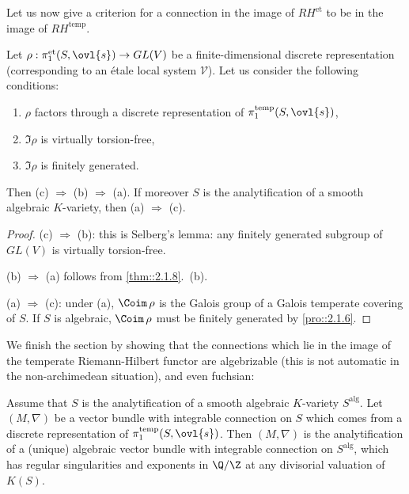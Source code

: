 \begin{para}\label{para::3.5.9} Let us now give a criterion for a connection
 in the image of $RH^{\mathrm{et}}$ to be in the image of $RH^{\mathrm{temp}}$.
\end{para}

\begin{pro}\label{pro::3.5.10} Let $\rho:
\pi_1^{\mathrm{et}}(S,\ovl{s}) \to GL(V)$ be a finite-dimensional
 discrete representation (corresponding to an \'etale local system 
 $\mathcal{V}$). Let us consider the following conditions:
 \begin{enumerate}
  \renewcommand{\theenumi}{\alph{enumi}}
  \item $\rho$ factors through a discrete representation of
	$\pi_1^{\mathrm{temp}}(S,\ovl{s})$,
  \item $\Im \rho$ is virtually torsion-free,
  \item $\Im \rho$ is finitely generated.
 \end{enumerate}
 Then {\rm (c)} $\Rightarrow$ {\rm (b)} $\Rightarrow$ {\rm (a)}. If moreover
 $S$ is the 
 analytification of a smooth algebraic $K$-variety, 
 then {\rm (a)} $\Rightarrow$ {\rm (c)}.
\end{pro}

\begin{proof}
 (c) $\Rightarrow$ (b): this is Selberg's lemma: any finitely
 generated subgroup of $GL(V)$ is virtually torsion-free.

 (b) $\Rightarrow$ (a) follows from \ref{thm::2.1.8}.~(b). 

 (a) $\Rightarrow$ (c): under (a), $\Coim\,\rho$ is the Galois group of a
 Galois temperate covering of $S$. If $S$ is 
 algebraic, $\Coim\,\rho$ must be finitely generated by \ref{pro::2.1.6}. 
\end{proof}

\begin{para}\label{para::3.5.11} We finish the section by showing that the
 connections which lie in the image of the temperate 
Riemann-Hilbert functor are algebrizable (this is not automatic in the
 non-archimedean situation), and even fuchsian: 
\end{para}

\begin{thm}\label{thm::3.5.12} Assume that $S$ is the analytification of
 a smooth algebraic $K$-variety $S^{\mathrm{alg}}$. Let 
 $(M,\nabla)$ be a vector bundle with integrable connection on $S$ which
 comes from a discrete representation of 
 $\pi_1^{\mathrm{temp}}(S,\ovl{s})$. Then $(M,\nabla)$ is the
 analytification of a (unique) algebraic vector 
 bundle with integrable connection on $S^{\mathrm{alg}}$, which has
 regular singularities and exponents in $\Q/\Z$ at any 
divisorial valuation of $K(S)$.  
\end{thm}

